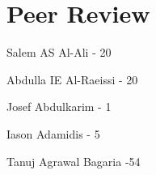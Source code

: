 
\section{Peer Review}

Salem AS Al-Ali - 20

Abdulla IE Al-Raeissi - 20

Josef Abdulkarim - 1

Iason Adamidis - 5 

Tanuj Agrawal Bagaria -54
